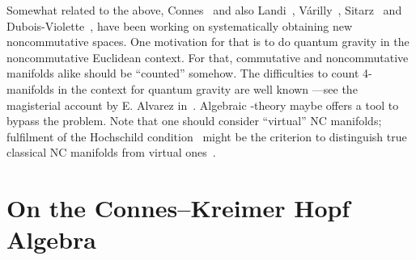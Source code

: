 \documentclass[a4paper,12pt]{article}
\providecommand{\1}{\mathbf{1}}         %
\providecommand{\7}{\dagger}            %
\providecommand{\8}{\bullet}            %
\renewcommand{\.}{\cdot}            %
\renewcommand{\:}{\colon}           %
\begin{document}
Somewhat related to the above, Connes~\cite{ConnesSurvey} and also
Landi~\cite{ConnesLa}, V\'arilly~\cite{Larissa},
Sitarz~\cite{SitarzSphere} and Dubois-Violette~\cite{ConnesDV}, have
been working on systematically obtaining new noncommutative spaces.
One motivation for that is to do quantum gravity in the noncommutative
Euclidean context. For that, commutative and noncommutative manifolds
alike should be ``counted'' somehow. The difficulties to count
4-manifolds in the context for quantum gravity are well known ---see
the magisterial account by E. Alvarez in~\cite{AlvarezQgrav}.
Algebraic \coordHE{}-theory maybe offers a tool to bypass the problem. Note
that one should consider ``virtual'' NC manifolds; fulfilment of the
Hochschild condition~\cite{ConnesGrav} might be the criterion to
distinguish true classical NC manifolds from virtual
ones~\cite{ConnesRemarkOW}.



\section{On the Connes--Kreimer Hopf Algebra}
\end{document}
